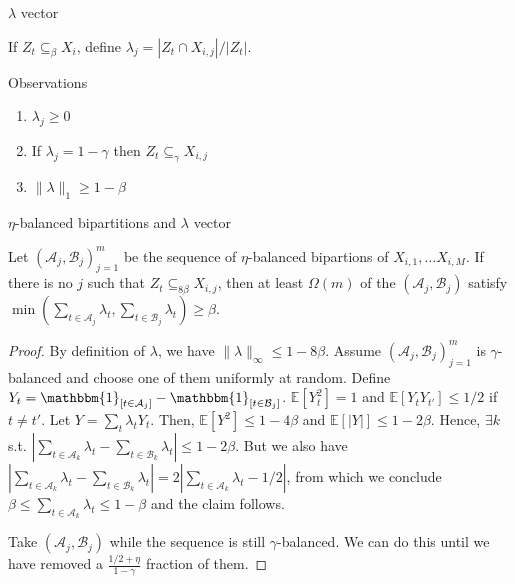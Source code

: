 \documentclass{beamer}
\newcommand{\1}{\mathbbm{1}}
\newcommand{\A}{\mathcal{A}}
\newcommand{\B}{\mathcal{B}}
\newcommand{\indicator}[1]{\1_{[#1]}}
\newcommand{\Exp}[1]{\mathbb{E}\left [#1 \right ]}
\begin{document}
\begin{frame}{$\lambda$ vector}
  \begin{definition}
    If $Z_t \subseteq_\beta X_i$, define $\lambda_j = |Z_t \cap X_{i, j}| / |Z_t|$.
  \end{definition}

  \pause

  \begin{block}{Observations}
    \begin{enumerate}
      \pause
      \item $\lambda_j \ge 0$
            \pause
      \item If $\lambda_j = 1 - \gamma$ then $Z_t \subseteq_\gamma X_{i, j}$
            \pause
      \item $\lVert \lambda \rVert_1 \ge 1 - \beta$
    \end{enumerate}
  \end{block}
\end{frame}

\begin{frame}{$\eta$-balanced bipartitions and $\lambda$ vector}
  \begin{lemma}
    Let $(\A_j, \B_j)_{j = 1}^m$ be the sequence of $\eta$-balanced bipartions of $X_{i,
          1}, \dots X_{i, M}$. If there is no $j$ such that $Z_t \subseteq_{8 \beta} X_{i, j}$,
    then at least $\Omega(m)$ of the $(\A_j, \B_j)$ satisfy $\min(\sum_{t \in \A_j}
      \lambda_t, \sum_{t \in \B_j} \lambda_t) \ge \beta$.
  \end{lemma}

  \pause

  \begin{proof}
    By definition of $\lambda$, we have $\lVert \lambda \rVert_\infty \le 1 - 8\beta$.
    \pause
    Assume $(\A_j, \B_j)_{j = 1}^m$ is $\gamma$-balanced and choose one of them uniformly at
    random.
    \pause
    Define $Y_t = \indicator{t \in \A_j} - \indicator{t \in \B_j}$.
    \pause
    $\Exp{Y_t^2} = 1$ and $\Exp{Y_t Y_{t'}} \le 1/2$ if $t \ne t'$.
    \pause
    Let $Y = \sum_t \lambda_t Y_t$.
    \pause
    Then, $\Exp{Y^2} \le 1 - 4 \beta$ and $\Exp{|Y|} \le 1 - 2 \beta$.
    \pause
    Hence, $\exists k$ s.t. $|\sum_{t \in \A_k} \lambda_t - \sum_{t \in \B_k} \lambda_t|
      \le 1 - 2 \beta$.
    \pause
    But we also have $|\sum_{t \in \A_k} \lambda_t - \sum_{t \in \B_k} \lambda_t| =
      2|\sum_{t \in \A_k} \lambda_t - 1/2|$,
    \pause
    from which we conclude $\beta \le \sum_{t \in \A_k} \lambda_t \le 1 - \beta$ and the
    claim follows.

    \pause
    Take $(\A_j, \B_j)$ while the sequence is still $\gamma$-balanced. We can do this
    until we have removed a $\frac{1/2 + \eta}{1 - \gamma}$ fraction of them.
  \end{proof}
\end{frame}
\end{document}
